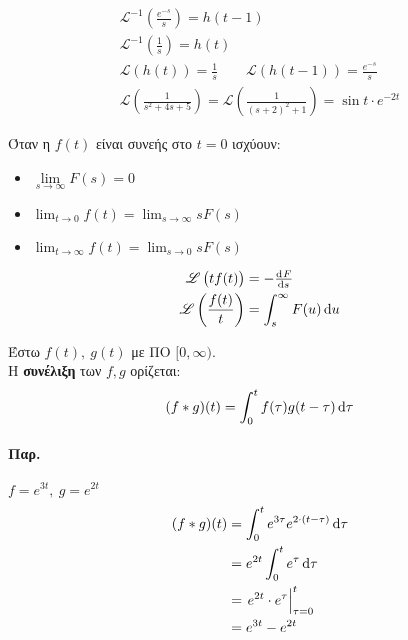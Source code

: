 \documentclass[11pt,a4paper,titlepage,draft]{article}
\begin{document}
\begin{gather*}
\mathscr{L}^{-1} \left(
\frac{e^{-s}}{s}\right)=h(t-1)\\
\mathscr{L}^{-1}\left(\frac{1}{s}\right) = h(t)\\
\mathscr{L}\left(
h(t)
\right) = \frac{1}{s}\qquad
\mathscr{L}\left(
h(t-1)
\right)=\frac{e^{-s}}{s}\\
\mathscr{L}\left(
\frac{1}{s^2+4s+5}
\right) = \mathscr{L}\left(
\frac{1}{(s+2)^2+1}
\right)=\sin t \cdot e^{-2t}
\end{gather*}

\begin{theorem*}{}
Όταν η \(f(t)\) είναι συνεής στο \(t=0\) ισχύουν:
\begin{itemize}
\item \(\lim\limits_{s\to \infty} F(s)=0 \)
\item \(\lim_{t\to0} f(t) = \lim_{s\to \infty} sF(s)  \)
\item \(\lim_{t\to \infty}f(t) = \lim_{s\to 0} s F(s)  \)
\end{itemize}
\end{theorem*}

\begin{theorem*}{}
\begin{align*}
\mathscr L\left( t f(t)\right) &= - \od{F}{s} \\
\mathscr L \left( \frac{f(t)}{t}\right) &= \int_s^\infty F(u) \dif u
\end{align*}

\end{theorem*}

\begin{defn*}{}
Έστω \(f(t),\ g(t)\) με ΠΟ \( [0,\infty) \). \\
Η \textbf{συνέλιξη} των \(f,g\) ορίζεται:
\[
(f*g)(t) = \int_0^t f(\tau)g(t-\tau)\dif\tau
\]
\end{defn*}

\paragraph{Παρ.}
\(f=e^{3t},\ g=e^{2t}\)
\begin{align*}
(f*g)(t) &= \int_0^t e^{3\tau} e^{2\cdot(t-\tau)}\dif \tau
\\ &=
e^{2t} \int_0^t e^\tau \dif\tau \\
&= \left. e^{2t} \cdot e^\tau  \right|_{\tau=0}^t
\\ &= e^{3t}-e^{2t}
\end{align*}
\end{document}
